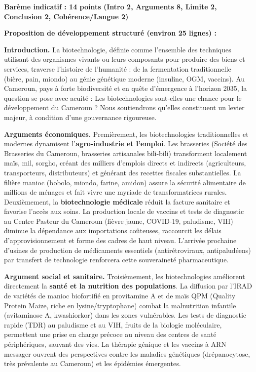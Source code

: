 \documentclass[11pt]{article}
\begin{document}
\begin{corrige}
\textbf{Barème indicatif : 14 points (Intro 2, Arguments 8, Limite 2, Conclusion 2, Cohérence/Langue 2)}

\textbf{Proposition de développement structuré (environ 25 lignes) :}

\textbf{Introduction.}
La biotechnologie, définie comme l'ensemble des techniques utilisant des organismes vivants ou leurs composants pour produire des biens et services, traverse l'histoire de l'humanité : de la fermentation traditionnelle (bière, pain, miondo) au génie génétique moderne (insuline, OGM, vaccins). Au Cameroun, pays à forte biodiversité et en quête d'émergence à l'horizon 2035, la question se pose avec acuité : \og Les biotechnologies sont-elles une chance pour le développement du Cameroun ? \fg{} Nous soutiendrons qu'elles constituent un levier majeur, à condition d'une gouvernance rigoureuse.

\textbf{Arguments économiques.}
Premièrement, les biotechnologies traditionnelles et modernes dynamisent l'\textbf{agro-industrie et l'emploi}. Les brasseries (Société des Brasseries du Cameroun, brasseries artisanales bili-bili) transforment localement maïs, mil, sorgho, créant des milliers d'emplois directs et indirects (agriculteurs, transporteurs, distributeurs) et générant des recettes fiscales substantielles. La filière manioc (bobolo, miondo, farine, amidon) assure la sécurité alimentaire de millions de ménages et fait vivre une myriade de transformatrices rurales. Deuxièmement, la \textbf{biotechnologie médicale} réduit la facture sanitaire et favorise l'accès aux soins. La production locale de vaccins et tests de diagnostic au Centre Pasteur du Cameroun (fièvre jaune, COVID-19, paludisme, VIH) diminue la dépendance aux importations coûteuses, raccourcit les délais d'approvisionnement et forme des cadres de haut niveau. L'arrivée prochaine d'usines de production de médicaments essentiels (antirétroviraux, antipaludéens) par transfert de technologie renforcera cette souveraineté pharmaceutique.

\textbf{Argument social et sanitaire.}
Troisièmement, les biotechnologies améliorent directement la \textbf{santé et la nutrition des populations}. La diffusion par l'IRAD de variétés de manioc biofortifié en provitamine A et de maïs QPM (Quality Protein Maize, riche en lysine/tryptophane) combat la malnutrition infantile (avitaminose A, kwashiorkor) dans les zones vulnérables. Les tests de diagnostic rapide (TDR) au paludisme et au VIH, fruits de la biologie moléculaire, permettent une prise en charge précoce au niveau des centres de santé périphériques, sauvant des vies. La thérapie génique et les vaccins à ARN messager ouvrent des perspectives contre les maladies génétiques (drépanocytose, très prévalente au Cameroun) et les épidémies émergentes.


\end{corrige}
\end{document}
